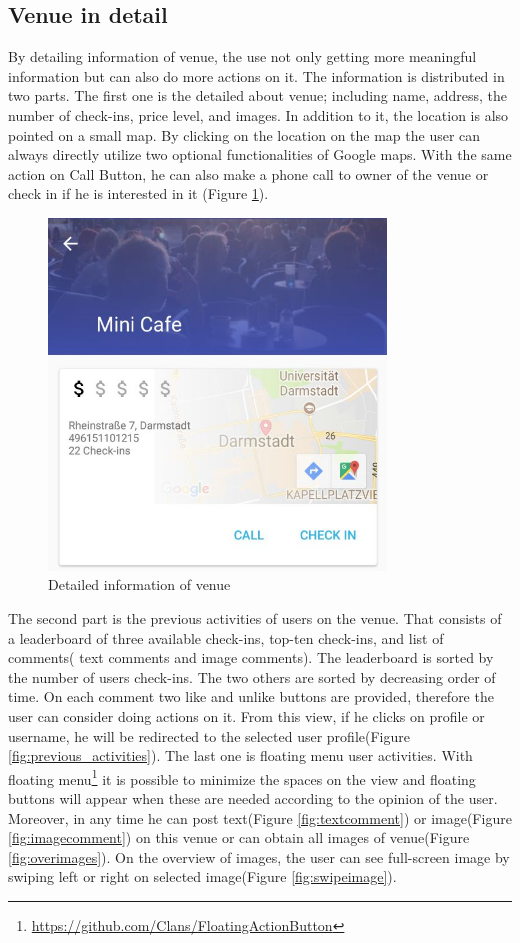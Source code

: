 \subsection{Venue in detail}
By detailing information of venue, the use not only getting more meaningful information but can also do more actions on it. The information is distributed in two parts. The first one is the detailed about venue; including name, address, the number of check-ins, price level, and images.
In addition to it, the location is also pointed on a small map. By clicking on the location on the map the user can always directly utilize two optional functionalities of Google maps. With the same action on Call Button, he can also make a phone call to owner of the venue or check in if he is interested in it (Figure \ref{fig:detailedInformationOfVenue}).
\begin{figure}[htbp]
	\includegraphics[width=0.8\textwidth]{images/venueInDetail_Part_1.jpg}
	\centering
	\caption{Detailed information of venue}\label{fig:detailedInformationOfVenue}
\end{figure}

The second part is the previous activities of users on the venue. That consists of a leaderboard of three available check-ins, top-ten check-ins, and list of comments( text comments and image comments). The leaderboard is sorted by the number of users check-ins. The two others are sorted by decreasing order of time. On each comment two like and unlike buttons are provided, therefore the user can consider doing actions on it. From this view, if he clicks on profile or username, he will be redirected to the selected user profile(Figure \ref{fig:previous_activities}).
The last one is floating menu user activities. With floating menu\footnote{\url{https://github.com/Clans/FloatingActionButton}} it is possible to minimize the spaces on the view and floating buttons will appear when these are needed according to the opinion of the user. Moreover, in any time he can post text(Figure \ref{fig:textcomment}) or image(Figure \ref{fig:imagecomment}) on this venue or can obtain all images of venue(Figure \ref{fig:overimages}). On the overview of images, the user can see full-screen image by swiping left or right on selected image(Figure \ref{fig:swipeimage}).

